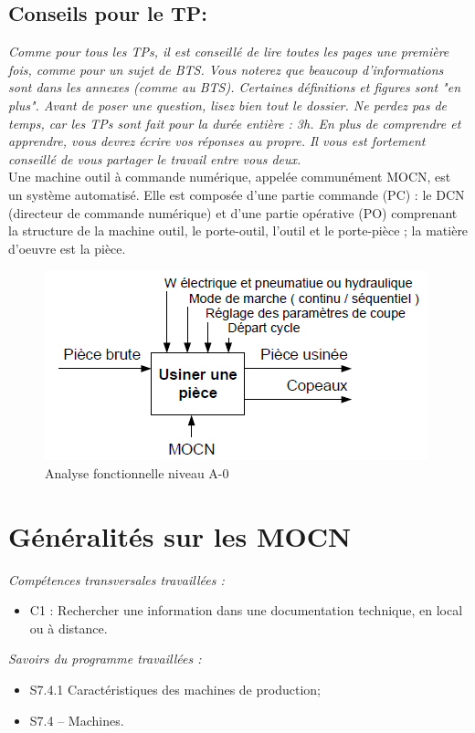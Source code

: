 \documentclass[12pt]{article}
\begin{document}
\subsection*{Conseils pour le TP:}
\textit{Comme pour tous les TPs, il est conseillé de lire toutes les pages une première fois, comme pour un sujet de BTS. Vous noterez que beaucoup d'informations sont dans les annexes (comme au BTS). Certaines définitions et figures sont "en plus". Avant de poser une question, lisez bien tout le dossier. Ne perdez pas de temps, car les TPs sont fait pour la durée entière : 3h. En plus de comprendre et apprendre, vous devrez écrire vos réponses au propre. Il vous est fortement conseillé de vous partager le travail entre vous deux.}\\

Une machine outil à commande numérique, appelée communément MOCN, est un système
automatisé. Elle est composée d’une partie commande (PC) : le DCN (directeur de commande
numérique) et d’une partie opérative (PO) comprenant la structure de la machine outil, le porte-outil, l’outil et le porte-pièce ; la matière d’oeuvre est la pièce.
\begin{figure}
\centering
\includegraphics[width=0.7\linewidth]{A0.PNG}
\caption{Analyse fonctionnelle niveau A-0}
\label{A0}
\end{figure}
\section{Généralités sur les MOCN}

\begin{minipage}{.55\linewidth}
\textit{Compétences transversales travaillées :}
\begin{itemize}
    \item C1 : Rechercher une information dans une documentation technique, en local ou à distance.
\end{itemize}

\end{minipage}
\begin{minipage}{.44\linewidth}
\textit{Savoirs du programme travaillées :}
\begin{itemize}
    \item S7.4.1 Caractéristiques des machines de production;
    \item S7.4 – Machines.
\end{itemize}
\end{minipage}
\end{document}
